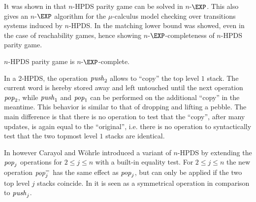 \documentclass[a4paper,UKenglish,cleveref, autoref, thm-restate]{lipics-v2021}
\begin{document}
It was shown in \cite{Cach03} that {\sc $n$-HPDS parity game} can
be solved in $n$-$\EXP$. This also gives an $n$-$\EXP$ algorithm for the $\mu$-calculus
model checking over transitions systems induced by  $n$-HPDS.
In \cite{cachat2007complexity} the matching lower bound was showed, even in the case of reachability games,
hence showing $n$-$\EXP$-completeness of {\sc $n$-HPDS parity game}.

\begin{theorem}{\cite{ Cach03, cachat2007complexity}}
{\sc $n$-HPDS parity game} is $n$-$\EXP$-complete.
\end{theorem}




In a $2$-HPDS, the operation $\text{\textit{push}}_2$ %
allows to ``copy'' the top level $1$ stack. The current word is hereby stored away and left untouched
until the next operation $\text{\textit{pop}}_2$,
while $\text{\textit{push}}_1$ and $\text{\textit{pop}}_1$ can be performed on the additional ``copy'' in the meantime. This behavior is similar to that of dropping and lifting a pebble. 
The main difference is that there is no operation to test that the ``copy'', after many updates, is again equal to the ``original'', i.e. there is no operation to syntactically test that the two topmost level $1$ stacks are identical.

In \cite{CaWoe03, Woeh05, carayol2006automates} however 
Carayol and W\"ohrle
 introduced a variant of $n$-HPDS by extending the 
$\text{\textit{pop}}_j$ operations for $2 \leq j \leq n$ with a built-in equality test. 
For $2 \leq j \leq n$ 
the new operation
$\text{\textit{pop}}_j^=$ has the same effect as $\text{\textit{pop}}_j$, but
can only be applied if the two top level $j$ stacks coincide.
In \cite{carayol2006automates} it is seen as a symmetrical operation in comparison to
$\text{\textit{push}}_j$.\\
\end{document}
